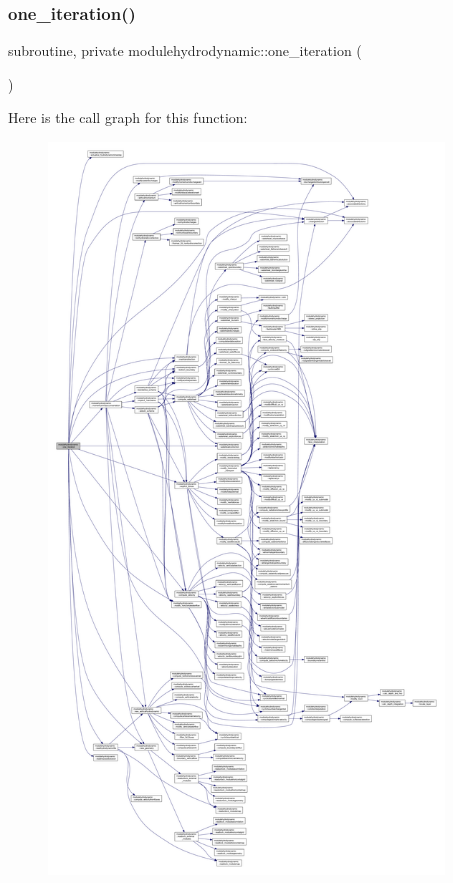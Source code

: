 \subsubsection{\texorpdfstring{one\+\_\+iteration()}{one\_iteration()}}
{\footnotesize\ttfamily subroutine, private modulehydrodynamic\+::one\+\_\+iteration (\begin{DoxyParamCaption}{ }\end{DoxyParamCaption})\hspace{0.3cm}{\ttfamily [private]}}

Here is the call graph for this function\+:\nopagebreak
\begin{figure}[H]
\begin{center}
\leavevmode
\includegraphics[height=550pt]{namespacemodulehydrodynamic_a054b8ffaff698f4cc430c2f7f0bc0da9_cgraph}
\end{center}
\end{figure}
